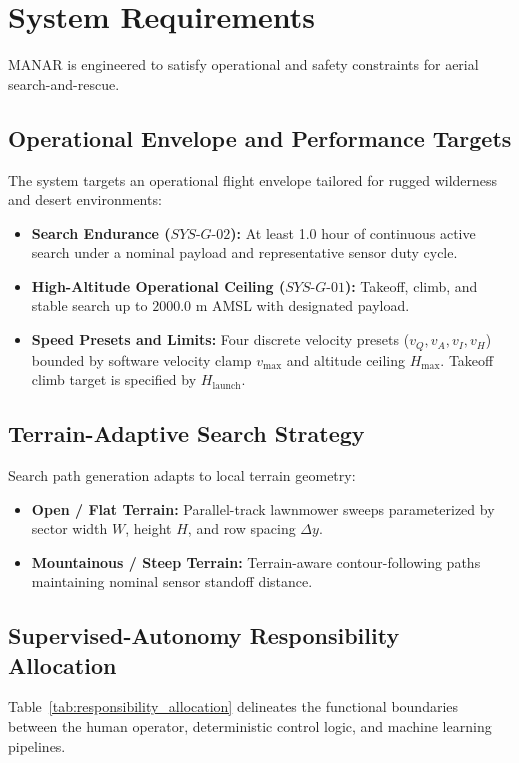 \section{System Requirements}

MANAR is engineered to satisfy operational and safety constraints for aerial search-and-rescue.

\subsection{Operational Envelope and Performance Targets}
The system targets an operational flight envelope tailored for rugged wilderness and desert environments:
\begin{itemize}
    \item \textbf{Search Endurance ($SYS\text{-}G\text{-}02$):} At least 1.0 hour of continuous active search under a nominal payload and representative sensor duty cycle.
    \item \textbf{High-Altitude Operational Ceiling ($SYS\text{-}G\text{-}01$):} Takeoff, climb, and stable search up to $2000.0\text{ m}$ AMSL with designated payload.
    \item \textbf{Speed Presets and Limits:} Four discrete velocity presets ($v_Q, v_A, v_I, v_H$) bounded by software velocity clamp $v_{\max}$ and altitude ceiling $H_{\max}$. Takeoff climb target is specified by $H_{\mathrm{launch}}$.
\end{itemize}

\subsection{Terrain-Adaptive Search Strategy}
Search path generation adapts to local terrain geometry:
\begin{itemize}
    \item \textbf{Open / Flat Terrain:} Parallel-track lawnmower sweeps parameterized by sector width $W$, height $H$, and row spacing $\Delta y$.
    \item \textbf{Mountainous / Steep Terrain:} Terrain-aware contour-following paths maintaining nominal sensor standoff distance.
\end{itemize}

\subsection{Supervised-Autonomy Responsibility Allocation}
Table~\ref{tab:responsibility_allocation} delineates the functional boundaries between the human operator, deterministic control logic, and machine learning pipelines.

